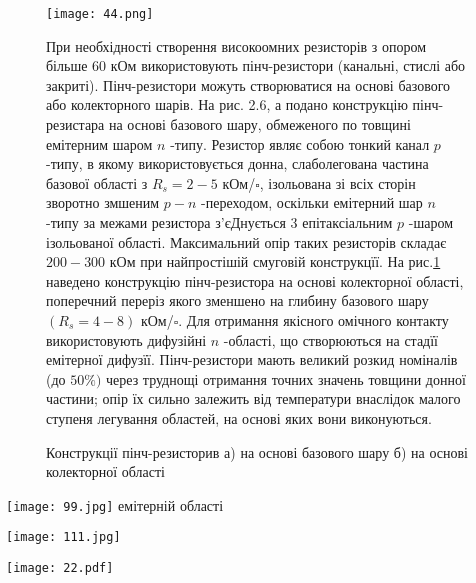 \documentclass[a4paper,14pt]{extreport}
\begin{document}
\begin{enumerate}
\begin{figure}[h]
   \end{figure}

  \begin{figure}[h]\item 
        \texttt{[image: 44.png]}
        \caption{Конструкції пінч-резисторив а) на основі базового шару б) на основі колекторної області}
        \label{r1}
        
        При необхідності створення високоомних резисторів з опором більше 60 кОм використовують пінч-резистори (канальні, стислі або закриті). Пінч-резистори можуть створюватися на основі базового або колекторного шарів. На рис. 2.6, а подано конструкцію пінч-резистара на основі базового шару, обмеженого по товщині емітерним шаром $n$ -типу. Резистор являє собою тонкий канал $p$ -типу, в якому використовується донна, слаболегована частина базової області з $R_{s}=2-5$ кОм/$\square$, ізольована зі всіх сторін зворотно змшеним $p-n$ -переходом, оскільки емітерний шар $n$ -типу за межами резистора з'єДнується 3 епітаксіальним $p$ -шаром ізольованої області. Максимальний опір таких резисторів складає $200-300$ кОм при найпростішій смуговій конструкцїї. На рис.\ref{r1} наведено конструкцію пінч-резистора на основі колекторної області, поперечний переріз якого зменшено на глибину базового шару $\left(R_{s}=4-8\right)$ кОм/$\square$. Для отримання якісного омічного контакту використовують дифузійні $n$ -області, що створюються на стадїї емітерної дифузїї. Пінч-резистори мають великий розкид номіналів (до $50 \%)$ через труднощі отримання точних значень товщини донної частини; опір їх сильно залежить від температури внаслідок малого ступеня легування областей, на основі яких вони виконуються.
        \end{figure}
  \item \texttt{[image: 99.jpg]} емітерній області
  \item \texttt{[image: 111.jpg]} 
  \item  \texttt{[image: 22.pdf]}
  \item






\end{enumerate}
\end{document}
